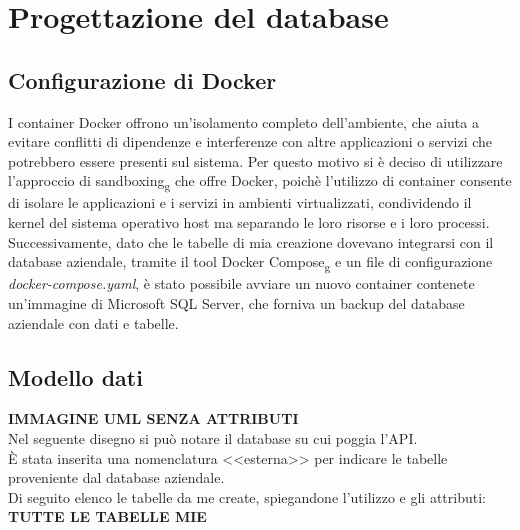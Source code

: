 \section{Progettazione del database}
\subsection{Configurazione di Docker}
I container Docker offrono un'isolamento completo dell'ambiente, che aiuta a evitare conflitti di dipendenze e interferenze con altre applicazioni o servizi che potrebbero essere presenti sul sistema. Per questo motivo si è deciso di utilizzare l'approccio di sandboxing\textsubscript{g} che offre Docker, poichè l'utilizzo di container consente di isolare le applicazioni e i servizi in ambienti virtualizzati, condividendo il kernel del sistema operativo host ma separando le loro risorse e i loro processi.\\
Successivamente, dato che le tabelle di mia creazione dovevano integrarsi con il database aziendale, tramite il tool Docker Compose\textsubscript{g} e un file di configurazione \textit{docker-compose.yaml}, è stato possibile avviare un nuovo container contenete un'immagine di Microsoft SQL Server, che forniva un backup del database aziendale con dati e tabelle.\\

\subsection{Modello dati}
\textbf{IMMAGINE UML SENZA ATTRIBUTI}\\

\noindent Nel seguente disegno si può notare il database su cui poggia l'API.\\
È stata inserita una nomenclatura <<esterna>> per indicare le tabelle proveniente dal database aziendale.\\
Di seguito elenco le tabelle da me create, spiegandone l'utilizzo e gli attributi:\\

\noindent \textbf{TUTTE LE TABELLE MIE}\\